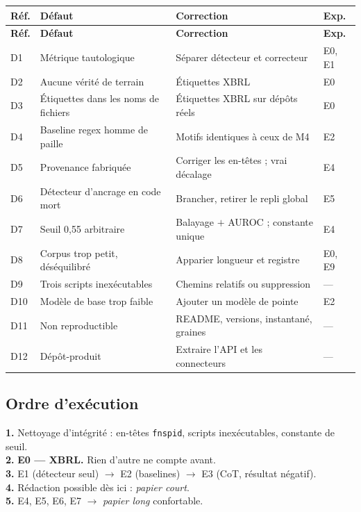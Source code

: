 \documentclass[11pt,a4paper]{article}
\newcommand{\fic}[1]{\texttt{\small #1}}
\begin{document}
{\small
\begin{longtable}{@{}p{}p{}p{}p{}@{}}
\toprule
\textbf{Réf.} & \textbf{Défaut} & \textbf{Correction} & \textbf{Exp.} \\
\midrule
\endfirsthead
\toprule
\textbf{Réf.} & \textbf{Défaut} & \textbf{Correction} & \textbf{Exp.} \\
\midrule
\endhead
D1 & Métrique tautologique & Séparer détecteur et correcteur & E0, E1 \\
D2 & Aucune vérité de terrain & Étiquettes XBRL & E0 \\
D3 & Étiquettes dans les noms de fichiers & Étiquettes XBRL sur dépôts réels & E0 \\
D4 & Baseline regex homme de paille & Motifs identiques à ceux de M4 & E2 \\
D5 & Provenance fabriquée & Corriger les en-têtes ; vrai décalage & E4 \\
D6 & Détecteur d'ancrage en code mort & Brancher, retirer le repli global & E5 \\
D7 & Seuil 0,55 arbitraire & Balayage $+$ AUROC ; constante unique & E4 \\
D8 & Corpus trop petit, déséquilibré & Apparier longueur et registre & E0, E9 \\
D9 & Trois scripts inexécutables & Chemins relatifs ou suppression & --- \\
D10 & Modèle de base trop faible & Ajouter un modèle de pointe & E2 \\
D11 & Non reproductible & README, versions, instantané, graines & --- \\
D12 & Dépôt-produit & Extraire l'API et les connecteurs & --- \\
\bottomrule
\end{longtable}
}

\subsection*{Ordre d'exécution}

\begin{center}
\begin{tcolorbox}[colback=cExpBg, colframe=cExp, boxrule=0.8pt, arc=2pt, width=0.95\textwidth]
\textbf{1.} Nettoyage d'intégrité : en-têtes \fic{fnspid}, scripts inexécutables,
constante de seuil.\\
\textbf{2.} \textbf{E0 --- XBRL.} Rien d'autre ne compte avant.\\
\textbf{3.} E1 (détecteur seul) $\rightarrow$ E2 (baselines) $\rightarrow$ E3
(CoT, résultat négatif).\\
\textbf{4.} Rédaction possible dès ici : \emph{papier court}.\\
\textbf{5.} E4, E5, E6, E7 $\rightarrow$ \emph{papier long} confortable.
\end{tcolorbox}
\end{center}
\end{document}
